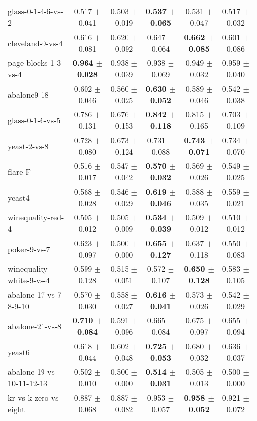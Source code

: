 \begin{table}[!ht]
{\begin{tabular}{l c c c c c}
glass-0-1-4-6-vs-2 & 0.517 $\pm$ 0.041 & 0.503 $\pm$ 0.019 & \textbf{0.537 $\pm$ 0.065} & 0.531 $\pm$ 0.047 & 0.517 $\pm$ 0.032 \\
cleveland-0-vs-4 & 0.616 $\pm$ 0.081 & 0.620 $\pm$ 0.092 & 0.647 $\pm$ 0.064 & \textbf{0.662 $\pm$ 0.085} & 0.601 $\pm$ 0.086 \\
page-blocks-1-3-vs-4 & \textbf{0.964 $\pm$ 0.028} & 0.938 $\pm$ 0.039 & 0.938 $\pm$ 0.069 & 0.949 $\pm$ 0.032 & 0.959 $\pm$ 0.040 \\
abalone9-18 & 0.602 $\pm$ 0.046 & 0.560 $\pm$ 0.025 & \textbf{0.630 $\pm$ 0.052} & 0.589 $\pm$ 0.046 & 0.542 $\pm$ 0.038 \\
glass-0-1-6-vs-5 & 0.786 $\pm$ 0.131 & 0.676 $\pm$ 0.153 & \textbf{0.842 $\pm$ 0.118} & 0.815 $\pm$ 0.165 & 0.703 $\pm$ 0.109 \\
yeast-2-vs-8 & 0.728 $\pm$ 0.080 & 0.673 $\pm$ 0.124 & 0.731 $\pm$ 0.088 & \textbf{0.743 $\pm$ 0.071} & 0.734 $\pm$ 0.070 \\
flare-F & 0.516 $\pm$ 0.017 & 0.547 $\pm$ 0.042 & \textbf{0.570 $\pm$ 0.032} & 0.569 $\pm$ 0.026 & 0.549 $\pm$ 0.025 \\
yeast4 & 0.568 $\pm$ 0.028 & 0.546 $\pm$ 0.029 & \textbf{0.619 $\pm$ 0.046} & 0.588 $\pm$ 0.035 & 0.559 $\pm$ 0.021 \\
winequality-red-4 & 0.505 $\pm$ 0.012 & 0.505 $\pm$ 0.009 & \textbf{0.534 $\pm$ 0.039} & 0.509 $\pm$ 0.012 & 0.510 $\pm$ 0.012 \\
poker-9-vs-7 & 0.623 $\pm$ 0.097 & 0.500 $\pm$ 0.000 & \textbf{0.655 $\pm$ 0.127} & 0.637 $\pm$ 0.118 & 0.550 $\pm$ 0.083 \\
winequality-white-9-vs-4 & 0.599 $\pm$ 0.128 & 0.515 $\pm$ 0.051 & 0.572 $\pm$ 0.107 & \textbf{0.650 $\pm$ 0.128} & 0.583 $\pm$ 0.105 \\
abalone-17-vs-7-8-9-10 & 0.570 $\pm$ 0.030 & 0.558 $\pm$ 0.027 & \textbf{0.616 $\pm$ 0.041} & 0.573 $\pm$ 0.026 & 0.542 $\pm$ 0.029 \\
abalone-21-vs-8 & \textbf{0.710 $\pm$ 0.084} & 0.591 $\pm$ 0.096 & 0.665 $\pm$ 0.084 & 0.675 $\pm$ 0.097 & 0.655 $\pm$ 0.094 \\
yeast6 & 0.618 $\pm$ 0.044 & 0.602 $\pm$ 0.048 & \textbf{0.725 $\pm$ 0.053} & 0.680 $\pm$ 0.032 & 0.636 $\pm$ 0.037 \\
abalone-19-vs-10-11-12-13 & 0.502 $\pm$ 0.010 & 0.500 $\pm$ 0.000 & \textbf{0.514 $\pm$ 0.031} & 0.505 $\pm$ 0.013 & 0.500 $\pm$ 0.000 \\
kr-vs-k-zero-vs-eight & 0.887 $\pm$ 0.068 & 0.887 $\pm$ 0.082 & 0.953 $\pm$ 0.057 & \textbf{0.958 $\pm$ 0.052} & 0.921 $\pm$ 0.072 \\

\end{tabular}}
\end{table}

